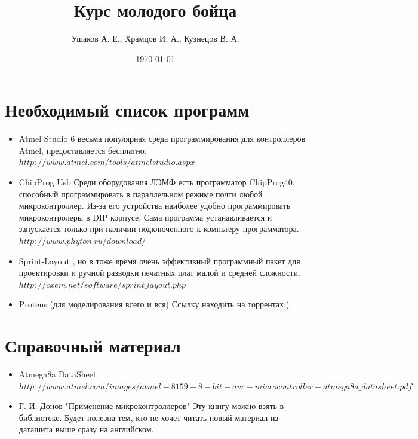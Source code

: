 \documentclass[12pt]{article}
\title{Курс молодого бойца}
\author{Ушаков А. Е., Храмцов И. А., Кузнецов В. А.}
\date{\today}
\begin{document}
\maketitle


\newpage
\tableofcontents
\newpage
\section{Необходимый список программ}
\begin{itemize}
\item Atmel Studio 6
 весьма популярная среда программирования для контроллеров Atmel, предоставляется бесплатно.
\newline $http://www.atmel.com/tools/atmelstudio.aspx$
\item ChipProg Usb
\newline Среди оборудования ЛЭМФ есть программатор ChipProg40, способный программировать в параллельном режиме почти любой микроконтроллер. Из-за его устройства наиболее удобно программировать микроконтролеры в DIP корпусе. Сама программа устанавливается и запускается только при наличии подключенного к компьтеру программатора.
\newline $http://www.phyton.ru/download/$
\item Sprint-Layout
, но в тоже время очень эффективный программный пакет для проектировки и ручной разводки печатных плат малой и средней сложности.
\newline $http://cxem.net/software/sprint\_layout.php$
\item Proteus (для моделирования всего и вся) Ссылку находить на торрентах:)
\end{itemize}
\section{Справочный материал}
\begin{itemize}
\item Atmega8a DataSheet 
\newline $http://www.atmel.com/images/atmel-8159-8-bit-avr-microcontroller-atmega8a\_datasheet.pdf$
\item Г. И. Донов "Применение микроконтроллеров"
\newline Эту книгу можно взять в библиотеке. Будет полезна тем, кто не хочет читать новый материал из даташита выше сразу на английском.
\end{itemize}
\end{document}
